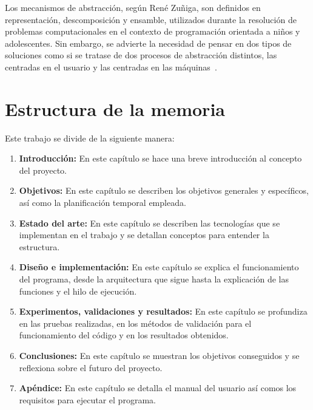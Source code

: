 \documentclass[a4paper, 12pt]{book}
\begin{document}
Los mecanismos de abstracción, según René Zuñiga, son definidos en representación, descomposición y ensamble, utilizados durante la resolución de problemas computacionales en el contexto de programación orientada a niños y adolescentes. Sin embargo, se advierte la necesidad de pensar en dos tipos de soluciones como si se tratase de dos procesos de abstracción distintos, las centradas en el usuario y las centradas en las máquinas~\cite{munoz2014abstraccion}.

\section{Estructura de la memoria}
\label{sec:estructura}

Este trabajo se divide de la siguiente manera:

\begin{enumerate}
  	\item \textbf{Introducción:} En este capítulo se hace una breve introducción al concepto del proyecto. 
  	\item \textbf{Objetivos:} En este capítulo se describen los objetivos generales y específicos, así como la planificación temporal empleada.
  	\item \textbf{Estado del arte:} En este capítulo se describen las tecnologías que se implementan en el trabajo y se detallan conceptos para entender la estructura.
  	\item \textbf{Diseño e implementación:} En este capítulo se explica el funcionamiento del programa, desde la arquitectura que sigue hasta la explicación de las funciones y el hilo de ejecución.
  	\item \textbf{Experimentos, validaciones y resultados:} En este capítulo se profundiza en las pruebas realizadas, en los métodos de validación para el funcionamiento del código y en los resultados obtenidos.
  	\item \textbf{Conclusiones:} En este capítulo se muestran los objetivos conseguidos y se reflexiona sobre el futuro del proyecto.
  	\item \textbf{Apéndice:} En este capítulo se detalla el manual del usuario así comos los requisitos para ejecutar el programa.  
\end{enumerate}

\end{document}
